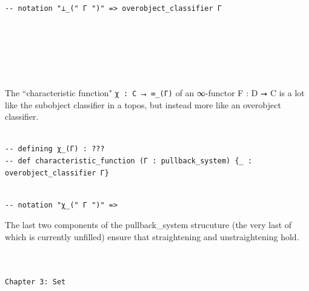 \documentclass{book}
\theoremstyle{definition}
\newcounter{pcounter}
\newcounter{lcounter}
\newcounter{sectioncount}
\newcounter{subsectioncount}
\renewcommand{\section}[1]{\newpage\ \\ \ \\ \begin{center} \scalebox{1.5}{\texttt{\thesectioncount . #1}} \stepcounter{sectioncount} \setcounter{subsectioncount}{1} \end{center} \begin{center} \ \\ \ \\ \thispagestyle{empty} \end{center}}
\renewcommand{\chapter}[1]{
\newpage
{
\Huge 
\begin{center}
\ \\
\ \\
\thispagestyle{empty}
\texttt{#1}
\end{center}}
\ \\
\ \\
}
\begin{document}
{{\begin{center}
\begin{tcolorbox}[width=5in,colback={white},title={\begin{center}\texttt{Lean \thelcounter} \addtocounter{lcounter}{1}  \end{center}},colbacktitle=Blue,coltitle=black]
\begin{verbatim}
-- notation "⊥_(" Γ ")" => overobject_classifier Γ

\end{verbatim}
\end{tcolorbox}
\end{center}

\section{$\texttt{χ\_(Γ)}$}

The ``characteristic function" \texttt{χ : C ⭢ ∞\_(Γ)} of an ∞-functor F : D ⭢ C is a lot like the subobject classifier in a topos, but instead more like an overobject classifier.

\begin{center}
\begin{tcolorbox}[width=5in,colback={white},title={\begin{center}\texttt{Lean \thelcounter} \addtocounter{lcounter}{1}  \end{center}},colbacktitle=Blue,coltitle=black]
\begin{verbatim}

-- defining χ_(Γ) : ???
-- def characteristic_function (Γ : pullback_system) {_ : overobject_classifier Γ}

\end{verbatim}
\end{tcolorbox}
\end{center}

\begin{center}
\begin{tcolorbox}[width=5in,colback={white},title={\begin{center}\texttt{Lean \thelcounter} \addtocounter{lcounter}{1}  \end{center}},colbacktitle=Blue,coltitle=black]
\begin{verbatim}

-- notation "χ_(" Γ ")" => 

\end{verbatim}
\end{tcolorbox}
\end{center}

The last two components of the pullback\_system strucuture (the very last of which is currently unfilled) ensure that straightening and unstraightening hold.\\


\chapter{Chapter 3: Set}

}}
\end{document}
